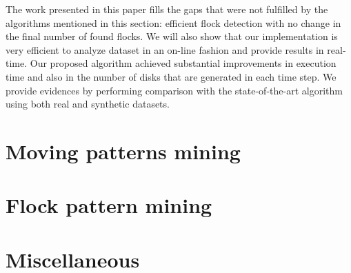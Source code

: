 The work presented in this paper fills the gaps that were not fulfilled by the algorithms mentioned in this section:
efficient flock detection with no change in the final number of found flocks. We will also show that our implementation
is very efficient to analyze dataset in an on-line fashion and provide results in real-time. Our proposed algorithm
achieved substantial improvements in execution time and also in the number of disks that are generated in each time
step. We provide evidences by performing comparison with the state-of-the-art algorithm using both real and synthetic
datasets.

\section{Moving patterns mining}
\label{sec:rel_moving}

\section{Flock pattern mining}
\label{sec:rel_flock}

\section{Miscellaneous}
\label{sec:rel_miscellaneous}
